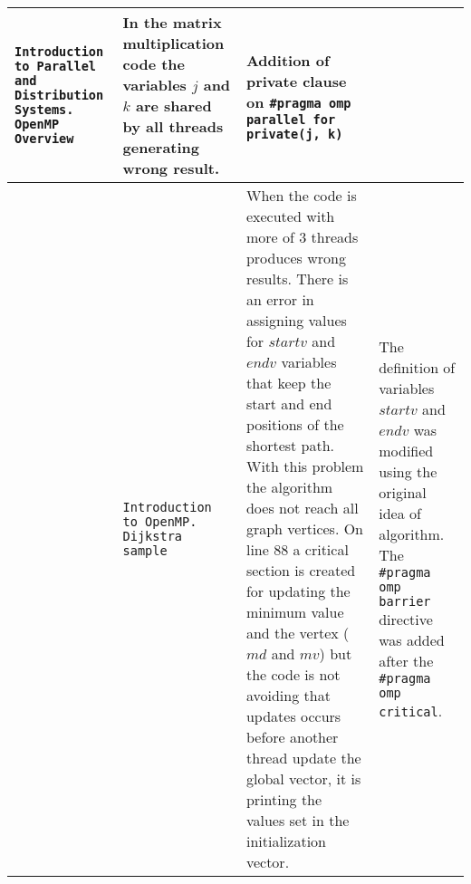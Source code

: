 \begin{table}[ht]
\begin{tabular}{|>{\centering\arraybackslash} m{.2cm}|>{\centering\arraybackslash} m{1.7cm}|  >{\centering\arraybackslash} m{2.75cm}|>{\centering\arraybackslash} m{2.75cm} |}
\begin{minipage}[t]{0.22\columnwidth}
\texttt{Introduction to Parallel and Distribution Systems. OpenMP Overview~\cite{UniversityWayne}}
\end{minipage}&
\begin{minipage}[t]{0.33\columnwidth}%
In the matrix multiplication code the variables $j$ and $k$ are shared by all threads generating wrong result.
\end{minipage}&
\begin{minipage}[t]{0.33\columnwidth}%
Addition of private clause on \tiny{\texttt{\#pragma omp parallel for private(j, k)}}
\end{minipage}
\tabularnewline
\hline
\begin{minipage}[m]{0.02\columnwidth}%
\centering
8
\end{minipage} &
\begin{minipage}[t]{0.22\columnwidth}%
\texttt{Introduction to OpenMP. Dijkstra sample~\cite{UniversityCalifornia}}
\end{minipage} & 
\begin{minipage}[t]{0.33\columnwidth}%
When the code is executed with more of 3 threads produces wrong results. There is an error in assigning values for $startv$ and $endv$ variables that keep the start and end positions of the shortest path. With this problem the algorithm does not reach all graph vertices. On line 88 a critical section is created for updating the minimum value and the vertex ($md$ and $mv$) but the code is not avoiding that updates occurs before another thread update the global vector, it is printing the values set in the initialization vector.
\end{minipage}&
\begin{minipage}[t]{0.33\columnwidth}%
The definition of variables $startv$ and $endv$ was modified using the original idea of algorithm. The \texttt{\#pragma omp barrier} directive was added after the \texttt{\#pragma omp critical}.
\end{minipage}
\tabularnewline
\hline

\end{tabular}
\end{table}


